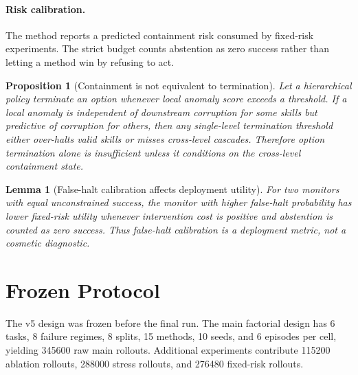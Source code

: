 \documentclass{article}
\newtheorem{proposition}{Proposition}
\newtheorem{lemma}{Lemma}
\begin{document}
\paragraph{Risk calibration.}
The method reports a predicted containment risk consumed by fixed-risk experiments. The strict budget counts abstention as zero success rather than letting a method win by refusing to act.

\begin{proposition}[Containment is not equivalent to termination]
Let a hierarchical policy terminate an option whenever local anomaly score exceeds a threshold. If a local anomaly is independent of downstream corruption for some skills but predictive of corruption for others, then any single-level termination threshold either over-halts valid skills or misses cross-level cascades. Therefore option termination alone is insufficient unless it conditions on the cross-level containment state.
\end{proposition}

\begin{lemma}[False-halt calibration affects deployment utility]
For two monitors with equal unconstrained success, the monitor with higher false-halt probability has lower fixed-risk utility whenever intervention cost is positive and abstention is counted as zero success. Thus false-halt calibration is a deployment metric, not a cosmetic diagnostic.
\end{lemma}

\section{Frozen Protocol}
The v5 design was frozen before the final run. The main factorial design has 6 tasks, 8 failure regimes, 8 splits, 15 methods, 10 seeds, and 6 episodes per cell, yielding 345600 raw main rollouts. Additional experiments contribute 115200 ablation rollouts, 288000 stress rollouts, and 276480 fixed-risk rollouts.
\end{document}
